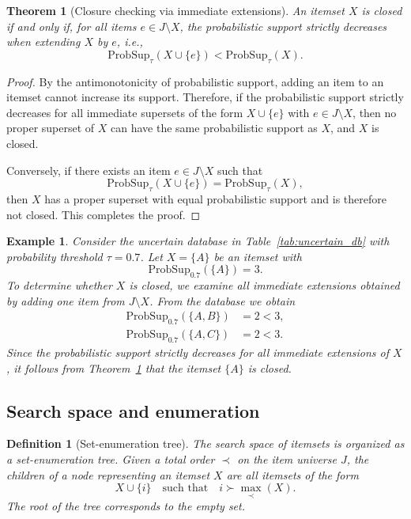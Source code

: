 \documentclass[10pt,letterpaper]{article}
\newtheorem{definition}{Definition}[section]
\newtheorem{theorem}{Theorem}
\newtheorem{example}{Example}[section]
\newcounter{definition}
\newcounter{example}
\begin{document}
\begin{theorem}[Closure checking via immediate extensions]
\label{thm:closure_immediate}
An itemset $X$ is closed if and only if, for all items $e \in J \setminus X$, the probabilistic support strictly decreases when extending $X$ by $e$, i.e.,
\begin{equation}
\mathrm{ProbSup}_{\tau}(X \cup \{e\}) < \mathrm{ProbSup}_{\tau}(X).
\label{eq:closure_check}
\end{equation}
\end{theorem}

\begin{proof}
By the antimonotonicity of probabilistic support, adding an item to an itemset cannot increase its support. Therefore, if the probabilistic support strictly decreases for all immediate supersets of the form $X \cup \{e\}$ with $e \in J \setminus X$, then no proper superset of $X$ can have the same probabilistic support as $X$, and $X$ is closed.

Conversely, if there exists an item $e \in J \setminus X$ such that
\[
\mathrm{ProbSup}_{\tau}(X \cup \{e\}) = \mathrm{ProbSup}_{\tau}(X),
\]
then $X$ has a proper superset with equal probabilistic support and is therefore not closed. This completes the proof.
\end{proof}

\begin{example}
\label{ex:closedA}
Consider the uncertain database in Table~\ref{tab:uncertain_db} with probability threshold $\tau = 0.7$. Let $X=\{A\}$ be an itemset with
\[
\mathrm{ProbSup}_{0.7}(\{A\}) = 3.
\]
To determine whether $X$ is closed, we examine all immediate extensions obtained by adding one item from $J \setminus X$. From the database we obtain
\begin{align*}
\mathrm{ProbSup}_{0.7}(\{A,B\}) &= 2 < 3, \\
\mathrm{ProbSup}_{0.7}(\{A,C\}) &= 2 < 3.
\end{align*}
Since the probabilistic support strictly decreases for all immediate extensions of $X$, it follows from Theorem~\ref{thm:closure_immediate} that the itemset $\{A\}$ is closed.
\end{example}

\subsection*{Search space and enumeration}
\label{subsec:search_space}

\begin{definition}[Set-enumeration tree]
\label{def:set_enum_tree}
The search space of itemsets is organized as a set-enumeration tree.  
Given a total order $\prec$ on the item universe $J$, the children of a node representing an itemset $X$ are all itemsets of the form
\[
X \cup \{i\} \quad \text{such that} \quad i \succ \max_{\prec}(X).
\]
The root of the tree corresponds to the empty set.
\end{definition}
\end{document}
